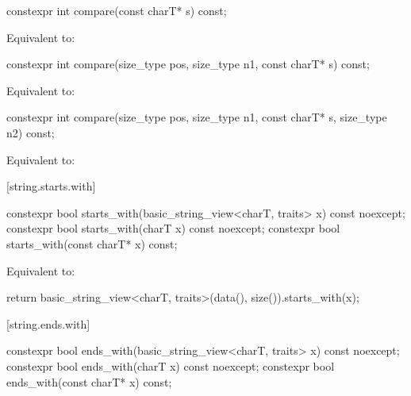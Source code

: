 %
\begin{itemdecl}
constexpr int compare(const charT* s) const;
\end{itemdecl}

\begin{itemdescr}
\pnum
\effects
Equivalent to:
\end{itemdescr}

%
\begin{itemdecl}
constexpr int compare(size_type pos, size_type n1, const charT* s) const;
\end{itemdecl}

\begin{itemdescr}
\pnum
\effects
Equivalent to: 
\end{itemdescr}

%
\begin{itemdecl}
constexpr int compare(size_type pos, size_type n1, const charT* s, size_type n2) const;
\end{itemdecl}

\begin{itemdescr}
\pnum
\effects
Equivalent to: 
\end{itemdescr}

[string.starts.with]{}

%
\begin{itemdecl}
constexpr bool starts_with(basic_string_view<charT, traits> x) const noexcept;
constexpr bool starts_with(charT x) const noexcept;
constexpr bool starts_with(const charT* x) const;
\end{itemdecl}

\begin{itemdescr}
\pnum
\effects
Equivalent to:
\begin{codeblock}
return basic_string_view<charT, traits>(data(), size()).starts_with(x);
\end{codeblock}
\end{itemdescr}

[string.ends.with]{}

%
\begin{itemdecl}
constexpr bool ends_with(basic_string_view<charT, traits> x) const noexcept;
constexpr bool ends_with(charT x) const noexcept;
constexpr bool ends_with(const charT* x) const;
\end{itemdecl}

